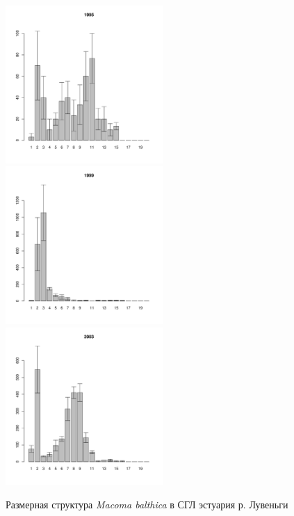 \begin{figure}[h]
\begin{multicols}{3}
\hfill
\includegraphics[width=60mm]{../White_Sea/Estuatiy_Luvenga/sizestr_1995_.pdf}
\hfill
\includegraphics[width=60mm]{../White_Sea/Estuatiy_Luvenga/sizestr_1999_.pdf}
\hfill
\includegraphics[width=60mm]{../White_Sea/Estuatiy_Luvenga/sizestr_2003_.pdf}
\end{multicols}


\caption{Размерная структура {\it Macoma balthica} в СГЛ эстуария р. Лувеньги}
\label{ris:size_str_estuary_Luv}
\end{figure}


